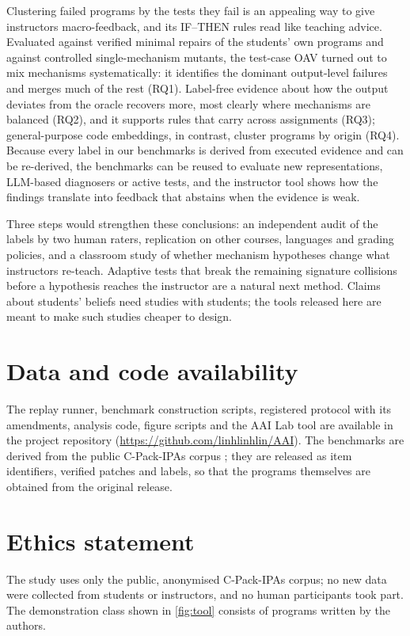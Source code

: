 \documentclass[a4paper,preprint,12pt,authoryear]{elsarticle}
\begin{document}
Clustering failed programs by the tests they fail is an appealing way to give instructors macro-feedback, and its IF--THEN rules read like teaching advice. Evaluated against verified minimal repairs of the students' own programs and against controlled single-mechanism mutants, the test-case OAV turned out to mix mechanisms systematically: it identifies the dominant output-level failures and merges much of the rest (RQ1). Label-free evidence about how the output deviates from the oracle recovers more, most clearly where mechanisms are balanced (RQ2), and it supports rules that carry across assignments (RQ3); general-purpose code embeddings, in contrast, cluster programs by origin (RQ4). Because every label in our benchmarks is derived from executed evidence and can be re-derived, the benchmarks can be reused to evaluate new representations, LLM-based diagnosers or active tests, and the instructor tool shows how the findings translate into feedback that abstains when the evidence is weak.

Three steps would strengthen these conclusions: an independent audit of the labels by two human raters, replication on other courses, languages and grading policies, and a classroom study of whether mechanism hypotheses change what instructors re-teach. Adaptive tests that break the remaining signature collisions before a hypothesis reaches the instructor are a natural next method. Claims about students' beliefs need studies with students; the tools released here are meant to make such studies cheaper to design.

\section*{Data and code availability}
The replay runner, benchmark construction scripts, registered protocol with its amendments, analysis code, figure scripts and the AAI Lab tool are available in the project repository (\url{https://github.com/linhlinhlin/AAI}). The benchmarks are derived from the public C-Pack-IPAs corpus \citep{orvalho2024cpack}; they are released as item identifiers, verified patches and labels, so that the programs themselves are obtained from the original release.

\section*{Ethics statement}
The study uses only the public, anonymised C-Pack-IPAs corpus; no new data were collected from students or instructors, and no human participants took part. The demonstration class shown in \cref{fig:tool} consists of programs written by the authors.
\end{document}
